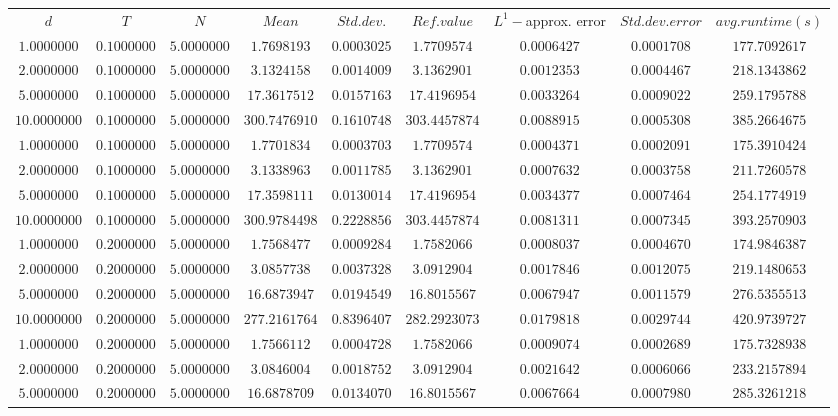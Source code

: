 \begin{tabular}{ccccccccc}
$d$ & $T$ & $N$ & $Mean$ & $Std. dev.$ & $Ref. value$ & $L^1-$approx. error & $Std. dev. error$ & $avg. runtime (s)$\\
$1.0000000$ & $0.1000000$ & $5.0000000$ & $1.7698193$ & $0.0003025$ & $1.7709574$ & $0.0006427$ & $0.0001708$ & $177.7092617$\\
$2.0000000$ & $0.1000000$ & $5.0000000$ & $3.1324158$ & $0.0014009$ & $3.1362901$ & $0.0012353$ & $0.0004467$ & $218.1343862$\\
$5.0000000$ & $0.1000000$ & $5.0000000$ & $17.3617512$ & $0.0157163$ & $17.4196954$ & $0.0033264$ & $0.0009022$ & $259.1795788$\\
$10.0000000$ & $0.1000000$ & $5.0000000$ & $300.7476910$ & $0.1610748$ & $303.4457874$ & $0.0088915$ & $0.0005308$ & $385.2664675$\\
$1.0000000$ & $0.1000000$ & $5.0000000$ & $1.7701834$ & $0.0003703$ & $1.7709574$ & $0.0004371$ & $0.0002091$ & $175.3910424$\\
$2.0000000$ & $0.1000000$ & $5.0000000$ & $3.1338963$ & $0.0011785$ & $3.1362901$ & $0.0007632$ & $0.0003758$ & $211.7260578$\\
$5.0000000$ & $0.1000000$ & $5.0000000$ & $17.3598111$ & $0.0130014$ & $17.4196954$ & $0.0034377$ & $0.0007464$ & $254.1774919$\\
$10.0000000$ & $0.1000000$ & $5.0000000$ & $300.9784498$ & $0.2228856$ & $303.4457874$ & $0.0081311$ & $0.0007345$ & $393.2570903$\\
$1.0000000$ & $0.2000000$ & $5.0000000$ & $1.7568477$ & $0.0009284$ & $1.7582066$ & $0.0008037$ & $0.0004670$ & $174.9846387$\\
$2.0000000$ & $0.2000000$ & $5.0000000$ & $3.0857738$ & $0.0037328$ & $3.0912904$ & $0.0017846$ & $0.0012075$ & $219.1480653$\\
$5.0000000$ & $0.2000000$ & $5.0000000$ & $16.6873947$ & $0.0194549$ & $16.8015567$ & $0.0067947$ & $0.0011579$ & $276.5355513$\\
$10.0000000$ & $0.2000000$ & $5.0000000$ & $277.2161764$ & $0.8396407$ & $282.2923073$ & $0.0179818$ & $0.0029744$ & $420.9739727$\\
$1.0000000$ & $0.2000000$ & $5.0000000$ & $1.7566112$ & $0.0004728$ & $1.7582066$ & $0.0009074$ & $0.0002689$ & $175.7328938$\\
$2.0000000$ & $0.2000000$ & $5.0000000$ & $3.0846004$ & $0.0018752$ & $3.0912904$ & $0.0021642$ & $0.0006066$ & $233.2157894$\\
$5.0000000$ & $0.2000000$ & $5.0000000$ & $16.6878709$ & $0.0134070$ & $16.8015567$ & $0.0067664$ & $0.0007980$ & $285.3261218$\\

\end{tabular}
